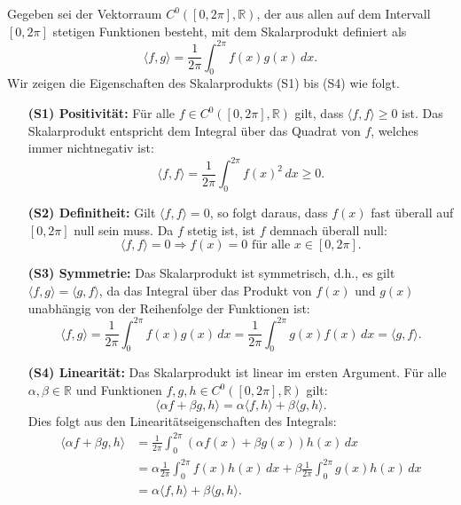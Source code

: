 Gegeben sei der Vektorraum \( C^0([0, 2\pi], \mathbb{R}) \), der aus allen auf dem Intervall \( [0, 2\pi] \) stetigen Funktionen besteht, mit dem Skalarprodukt definiert als
\[
\langle f, g \rangle = \frac{1}{2\pi} \int_{0}^{2\pi} f(x)g(x) \, dx.
\]
Wir zeigen die Eigenschaften des Skalarprodukts (S1) bis (S4) wie folgt.

\begin{itemize}
    \item[\textbf{(S1) Positivität:}]
    Für alle \( f \in C^0([0, 2\pi], \mathbb{R}) \) gilt, dass \( \langle f, f \rangle \geq 0 \) ist. Das Skalarprodukt entspricht dem Integral über das Quadrat von \( f \), welches immer nichtnegativ ist:
    \[
    \langle f, f \rangle = \frac{1}{2\pi} \int_{0}^{2\pi} f(x)^2 \, dx \geq 0.
    \]

    \item[\textbf{(S2) Definitheit:}]
    Gilt \( \langle f, f \rangle = 0 \), so folgt daraus, dass \( f(x) \) fast überall auf \( [0, 2\pi] \) null sein muss. Da \( f \) stetig ist, ist \( f \) demnach überall null:
    \[
    \langle f, f \rangle = 0 \Rightarrow f(x) = 0 \text{ für alle } x \in [0, 2\pi].
    \]

    \item[\textbf{(S3) Symmetrie:}]
    Das Skalarprodukt ist symmetrisch, d.h., es gilt \( \langle f, g \rangle = \langle g, f \rangle \), da das Integral über das Produkt von \( f(x) \) und \( g(x) \) unabhängig von der Reihenfolge der Funktionen ist:
    \[
    \langle f, g \rangle = \frac{1}{2\pi} \int_{0}^{2\pi} f(x)g(x) \, dx = \frac{1}{2\pi} \int_{0}^{2\pi} g(x)f(x) \, dx = \langle g, f \rangle.
    \]

    \item[\textbf{(S4) Linearität:}]
    Das Skalarprodukt ist linear im ersten Argument. Für alle \( \alpha, \beta \in \mathbb{R} \) und Funktionen \( f, g, h \in C^0([0, 2\pi], \mathbb{R}) \) gilt:
    \[
    \langle \alpha f + \beta g, h \rangle = \alpha \langle f, h \rangle + \beta \langle g, h \rangle.
    \]
    Dies folgt aus den Linearitätseigenschaften des Integrals:
    \begin{align*}
        \langle \alpha f + \beta g, h \rangle &= \frac{1}{2\pi} \int_{0}^{2\pi} (\alpha f(x) + \beta g(x))h(x) \, dx \\
        &= \alpha \frac{1}{2\pi} \int_{0}^{2\pi} f(x)h(x) \, dx + \beta \frac{1}{2\pi} \int_{0}^{2\pi} g(x)h(x) \, dx \\
        &= \alpha \langle f, h \rangle + \beta \langle g, h \rangle.
    \end{align*}
\end{itemize}
